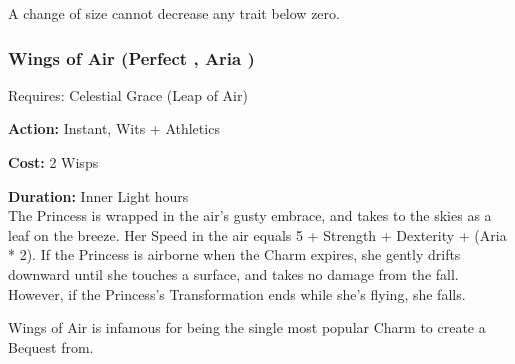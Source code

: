 A change of size cannot decrease any trait below zero. 

\subsubsection*{Wings of Air (Perfect \textbullet\textbullet\textbullet\textbullet, Aria \textbullet\textbullet\textbullet)}

\noindent Requires: Celestial Grace (Leap of Air)

\noindent \textbf{Action:} Instant, Wits + Athletics

\noindent \textbf{Cost:} 2 Wisps

\noindent \textbf{Duration:} Inner Light hours \\

\noindent The Princess is wrapped in the air's gusty embrace, and takes to the skies as a leaf on the breeze. Her Speed in the air equals 5 + Strength + Dexterity + (Aria * 2). If the Princess is airborne when the Charm expires, she gently drifts downward until she touches a surface, and takes no damage from the fall. However, if the Princess's Transformation ends while she's flying, she falls.

Wings of Air is infamous for being the single most popular Charm to create a Bequest from. 

